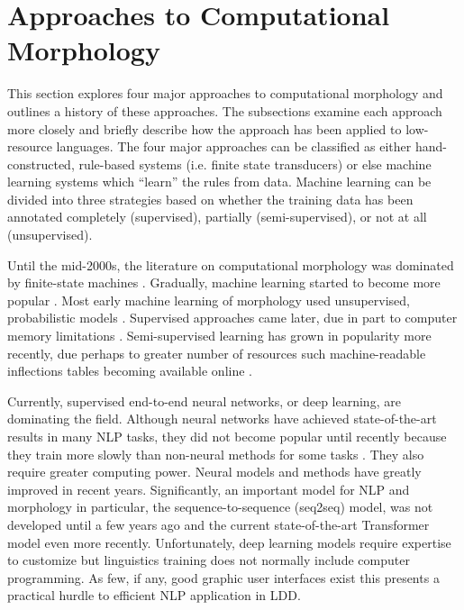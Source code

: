 \documentclass[12pt]{article}
\begin{document}
\section{Approaches to Computational Morphology}
\label{compMorph}

This section explores four major approaches to computational morphology and outlines a history of these approaches. The subsections examine each approach more closely and briefly describe how the approach has been applied to low-resource languages. The four major approaches can be classified as either hand-constructed, rule-based systems (i.e. finite state transducers) or else machine learning systems which ``learn'' the rules from data. Machine learning can be divided into three strategies based on whether the training data has been annotated completely (supervised), partially (semi-supervised), or not at all (unsupervised). 

Until the mid-2000s, the literature on computational morphology was dominated by finite-state machines \cite{kaplan_phonological_1981,koskenniemi_two-level_1983,beesley_finite-state_2003}. Gradually, machine learning started to become more popular \cite{cohen_joint_2007,ruokolainen_comparative_2016}. Most early machine learning of morphology used unsupervised, probabilistic models \cite{roark_computational_2007}. Supervised approaches came later, due in part to computer memory limitations \cite{hammarstrom_unsupervised_2011}. Semi-supervised learning has grown in popularity more recently, due perhaps to greater number of resources such machine-readable inflections tables becoming available online \cite{schone_knowledge-free_2001,soricut_unsupervised_2015,goldsmith_computational_2017}. 

Currently, supervised end-to-end neural networks, or deep learning, are dominating the field. Although neural networks have achieved state-of-the-art results in many NLP tasks, they did not become popular until recently because they train more slowly than non-neural methods for some tasks \cite{cotterell_cross-lingual_2017}. They also require greater computing power. Neural models and methods have greatly improved in recent years. Significantly, an important model for NLP and morphology in particular, the sequence-to-sequence (seq2seq) model, was not developed until a few years ago and the current state-of-the-art Transformer model even more recently. Unfortunately, deep learning models require expertise to customize but linguistics training does not normally include computer programming. As few, if any, good graphic user interfaces exist this presents a practical hurdle to efficient NLP application in LDD.  
\end{document}
